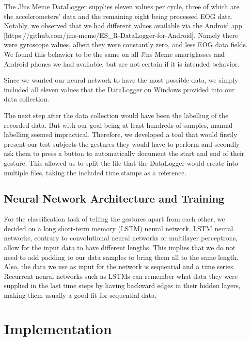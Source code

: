 \documentclass[runningheads]{llncs}
\begin{document}
The J!ns Meme DataLogger supplies eleven values per cycle, three of which are the
accelerometers' data and the remaining eight being processed EOG data.
Notably, we observed that we had different values available via the Android app
[https://github.com/jins-meme/ES\_R-DataLogger-for-Android]. Namely
there were gyroscope values, albeit they were constantly zero, and less EOG data fields.
We found this behavior to be the same on all J!ns Meme smartglasses and Android phones
we had available, but are not certain if it is intended behavior.

Since we wanted our neural network to have the most possible data, we simply included all
eleven values that the DataLogger on Windows provided into our data collection.

The next step after the data collection would have been the labelling of the recorded data.
But with our goal being at least hundreds of samples, manual labelling seemed impractical.
Therefore, we developed a tool that would firstly present our test subjects the
gestures they would have to perform and secondly ask them to press a button to
automatically document the start and end of their gesture. This allowed us to split the
file that the DataLogger would create into multiple files, taking the included time
stamps as a reference.

\subsection{Neural Network Architecture and Training} \label{subsec:nnArchAndTraining}
For the classification task of telling the gestures apart from each other, we decided on
a long short-term memory (LSTM) neural network. LSTM neural networks, contrary to convolutional neural networks
or multilayer perceptrons, allow for the input data to have different lengths. This
implies that we do not need to add padding to our data samples to bring them all to the
same length. Also, the data we use as input for the network is sequential and a time
series. Recurrent neural networks such as LSTMs can remember what data they were supplied
in the last time steps by having backward edges in their hidden layers, making them
usually a good fit for sequential data.

\section{Implementation}
\end{document}
